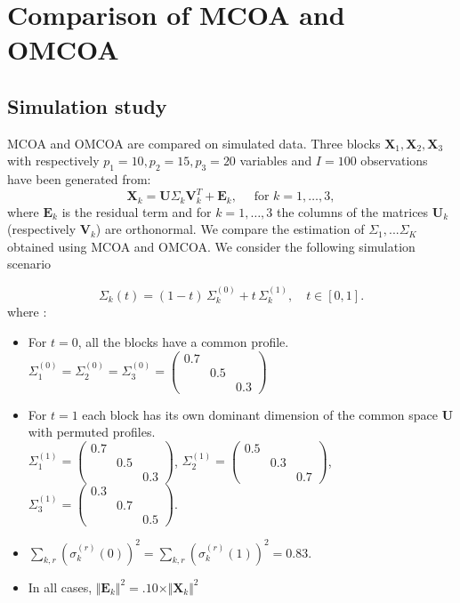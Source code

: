 \documentclass[11pt]{article}
\newcommand{\X}{\textbf{X}}
\newcommand{\U}{\textbf{U}}
\newcommand{\V}{\textbf{V}}
\newcommand{\EE}{\textbf{E}}
\begin{document}
\section{Comparison of MCOA and OMCOA}
\subsection{Simulation study}
MCOA and OMCOA  are compared on simulated data. Three blocks $\X_1,\X_2,\X_3$ with respectively $p_1=10,p_2=15,p_3=20$ variables and $I=100$ observations have been generated from:
\[\X_k=\U\Sigma_k\V_k^T+\textbf{E}_k, \quad \text{ for } k=1,\ldots,3,\]  
where $\textbf{E}_k$ is the residual term and for $k=1,\ldots,3$ the columns of the matrices $\U_k$ (respectively $\V_k$) are orthonormal.
We compare the estimation of $\Sigma_1,...\Sigma_K$ obtained using MCOA and OMCOA.
We consider the following simulation scenario

$$\Sigma_k(t)=(1-t)\,\Sigma^{(0)}_k+t\,\Sigma_k^{(1)}, \quad t\in[0,1].$$ 
where :
\begin{itemize}
    \item For $t=0$, all the blocks have a common profile. \\
    $\Sigma^{(0)}_1=\Sigma^{(0)}_2=\Sigma^{(0)}_3=\begin{pmatrix}
        0.7 & & \\
        & 0.5 & \\
        & & 0.3
    \end{pmatrix}$
   
    \item  For $t=1$ each block has its own dominant dimension of the common space $\U$ with permuted profiles.\\
     $\Sigma^{(1)}_1=\begin{pmatrix}
        0.7 & & \\
        & 0.5 & \\
        & & 0.3
    \end{pmatrix}$, $\Sigma^{(1)}_2=\begin{pmatrix}
        0.5 & & \\
        & 0.3 & \\
        & & 0.7
    \end{pmatrix}$, $\Sigma^{(1)}_3=\begin{pmatrix}
        0.3 & & \\
        & 0.7 & \\
        & & 0.5
    \end{pmatrix}$.
\item  $\sum_{k,r}(\sigma_k^{(r)}(0))^2=\sum_{k,r}(\sigma_k^{(r)}(1))^2=0.83$.
\item In all cases, $\Vert \EE_k\Vert^2=.10 \times \Vert \X_k\Vert^2$
\end{itemize} 
 
\end{document}
